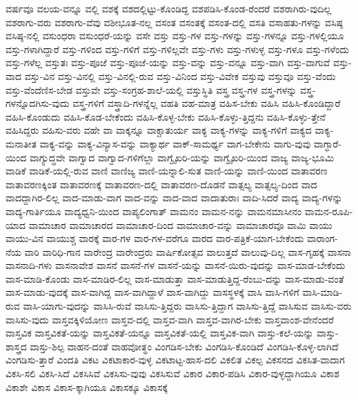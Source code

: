 {ವರ್ಷವೂ
ವಲಯ-ವನ್ನೂ
ವಲ್ಲಿ
ವಶಕ್ಕೆ
ವಶದಲ್ಲಿಟ್ಟು-ಕೊಂಡಿದ್ದ
ವಶಪಡಿಸಿ-ಕೊಂಡ-ರೆಂದರೆ
ವಶರಾಗಿರು-ವುದಿಲ್ಲ
ವಶರಾಗು-ವರು
ವಶರಾಗು-ವೆವು
ವಶೀಭೂತ-ನಲ್ಲ
ವಸಂತ
ವಸಂತಕ್ಕೆ
ವಸಂತ-ದಲ್ಲಿ
ವಸತಿ
ವಸಾಹತು-ಗಳನ್ನು
ವಸಿಷ್ಠ
ವಸಿಷ್ಠ-ನಲ್ಲಿ
ವಸುಂಧರಾ
ವಸುಂಧರೆ-ಯನ್ನು
ವಸೇ
ವಸ್ತು
ವಸ್ತು-ಗಳ
ವಸ್ತು-ಗಳನ್ನು
ವಸ್ತು-ಗಳನ್ನೂ
ವಸ್ತು-ಗಳಲ್ಲಿಯೂ
ವಸ್ತು-ಗಳಾಗಿದ್ದಾರೆ
ವಸ್ತು-ಗಳಿಂದ
ವಸ್ತು-ಗಳಿಗೆ
ವಸ್ತು-ಗಳಿಲ್ಲವೇ
ವಸ್ತು-ಗಳು
ವಸ್ತು-ಗಳುಳ್ಳ
ವಸ್ತು-ಗಳೂ
ವಸ್ತು-ಗಳೆಂದು
ವಸ್ತು-ಗಳೆಲ್ಲ
ವಸ್ತುತಃ
ವಸ್ತು-ಪೂಜೆ
ವಸ್ತು-ಪೂಜೆ-ಯನ್ನು
ವಸ್ತು-ವನ್ನು
ವಸ್ತು-ವನ್ನೂ
ವಸ್ತು-ವಾಗಿ
ವಸ್ತು-ವಾಗುವೆ
ವಸ್ತು-ವಾದ
ವಸ್ತು-ವಿನ
ವಸ್ತು-ವಿನಲ್ಲಿ
ವಸ್ತು-ವಿನಲ್ಲಿ-ರುವ
ವಸ್ತು-ವಿನಿಂದ
ವಸ್ತು-ವಿವೇಕ
ವಸ್ತುವು
ವಸ್ತುವೂ
ವಸ್ತು-ವೆಂದು
ವಸ್ತು-ವೆಂದೆಣಿಸ-ಬೇಡ
ವಸ್ತುವೇ
ವಸ್ತು-ಸಂಗ್ರಹ-ಶಾಲೆ-ಯಲ್ಲಿ
ವಸ್ತುಸ್ಥಿತಿ
ವಸ್ತ್ರ
ವಸ್ತ್ರ-ಗಳ
ವಸ್ತ್ರ-ಗಳನ್ನು
ವಸ್ತ್ರ-ಗಳನ್ನೊದಗಿಸು-ವುದು
ವಸ್ತ್ರ-ಗಳಿಗೆ
ವಸ್ತ್ರಾದಿ-ಗಳನ್ನೆಲ್ಲ
ವಹತಿ
ವಹ-ಮಾತ್ರ
ವಹಿಸ-ಬೇಕು
ವಹಿಸಿ
ವಹಿಸಿ-ಕೊಂಡಿದ್ದಾರೆ
ವಹಿಸಿ-ಕೊಂಡುದು
ವಹಿಸಿ-ಕೊಡ-ಬೇಕೆಂದು
ವಹಿಸಿ-ಕೊಳ್ಳ-ಬೇಕು
ವಹಿಸಿ-ಕೊಳ್ಳು-ತ್ತಿದ್ದನು
ವಹಿಸಿ-ಕೊಳ್ಳು-ತ್ತೇನೆ
ವಹಿಸಿದ್ದರು
ವಹಿಸು-ವರು
ವಹೇ
ವಾ
ವಾಕ್ಕನ್ನೂ
ವಾಕ್ಚಾತುರ್ಯ
ವಾಕ್ಯ
ವಾಕ್ಯ-ಗಳನ್ನು
ವಾಕ್ಯ-ಗಳಿಗೆ
ವಾಕ್ಯದ
ವಾಕ್ಯ-ಮನಾತೀತ
ವಾಕ್ಯ-ವನ್ನು
ವಾಕ್ಯ-ವಿನ್ಯಾಸ-ವನ್ನು
ವಾಕ್ಯಾರ್ಥ
ವಾಕ್-ಸಾಮರ್ಥ್ಯ
ವಾಗ-ಬೇಕೇನು
ವಾಗು-ವುವು
ವಾಗ್ಧಾರೆ-ಯಿಂದ
ವಾಗ್ಯುದ್ಧವೇ
ವಾಗ್ವಾದ
ವಾಗ್ವಾದ-ಗಳಿಗೆಲ್ಲಾ
ವಾಗ್ವೈಖರಿ-ಯನ್ನು
ವಾಗ್ವೈಖರಿ-ಯಿಂದ
ವಾಜ್ಯ
ವಾಜ್ಯ-ಭೂಮಿ
ವಾಡಿಕೆ
ವಾಡಿಕೆ-ಯಲ್ಲಿ-ರುವ
ವಾಣಿ
ವಾಣಿಜ್ಯ
ವಾಣಿ-ಯನ್ನಾಲಿ-ಸುತ
ವಾಣಿ-ಯನ್ನು
ವಾಣಿ-ಯಿಂದ
ವಾತಾವರಣ
ವಾತಾವರಣಕ್ಕಿಂತ
ವಾತಾವರಣಕ್ಕೆ
ವಾತಾವರಣ-ದಲ್ಲಿ
ವಾತಾವರಣ-ದೊಡನೆ
ವಾತ್ಸಲ್ಯ
ವಾತ್ಸಲ್ಯ-ದಿಂದ
ವಾದ
ವಾದದ್ದಾಗಿರ-ಲಿಲ್ಲ
ವಾದ-ಮಾಡು-ವಾಗ
ವಾದ-ವನ್ನು
ವಾದ-ವಾದ
ವಾದಾತುರಾಃ
ವಾದಿ-ಸಿದರೆ
ವಾದ್ಯ
ವಾದ್ಯ-ಗಳನ್ನು
ವಾದ್ಯ-ಗಾರ್ತಿಯೂ
ವಾದ್ಯಧ್ವನಿ-ಯಿಂದ
ವಾಪ್ಯಲಿಂಗಾತ್
ವಾಮನಂ
ವಾಮನ-ನನ್ನು
ವಾಮನಮಾಸೀನಂ
ವಾಮನ-ರೂಪಿ-ಯಾದ
ವಾಮಾಚಾರ
ವಾಮಾಚಾರದ
ವಾಮಾಚಾರ-ದಿಂದ
ವಾಮಾಚಾರ-ವನ್ನು
ವಾಮಾಚಾರವೂ
ವಾಮಿ
ವಾಯು
ವಾಯು-ವಿನ
ವಾಯುಶ್ಚ
ವಾರಕ್ಕೆ
ವಾರ-ಗಳ
ವಾರ-ಗಳ-ವರೆಗೂ
ವಾರದ
ವಾರ-ಪತ್ರಿಕೆ-ಯಾಗ-ಬೇಕೆಂದು
ವಾರಾಂಗ-ನೆಯ
ವಾರಿ
ವಾರಿಧಿ-ಗಾನ
ವಾರೇಂದ್ರ
ವಾರೇಂದ್ರರು
ವಾರ್ಷಿಕೋತ್ಸವ
ವಾಲುತ್ತದೆ
ವಾಲುವು-ದಿಲ್ಲ
ವಾಸ-ಗೃಹಕ್ಕೆ
ವಾಸನಾ
ವಾಸನಾದಿ-ಗಳು
ವಾಸನಾವೇಶ
ವಾಸನೆ
ವಾಸನೆ-ಗಳ
ವಾಸನೆ-ಯನ್ನು
ವಾಸನೆ-ಯಿರು-ವುದನ್ನು
ವಾಸ-ಮಾಡ-ಬೇಕೆಂದು
ವಾಸ-ಮಾಡಿ-ಕೊಂಡು
ವಾಸ-ಮಾಡಿರ-ಲಿಲ್ಲ
ವಾಸ-ಮಾಡುತ್ತಾ
ವಾಸ-ಮಾಡುತ್ತಿದ್ದ-ರೆಂಬು-ದನ್ನು
ವಾಸ-ಮಾಡು-ವಂತೆ
ವಾಸ-ಮಾಡು-ವುದಕ್ಕೆ
ವಾಸ-ವಾಗಿದ್ದ
ವಾಸ-ವಾಗಿದ್ದಾಳೆ
ವಾಸ-ವಾಗಿದ್ದು
ವಾಸಸ್ಥಳಕ್ಕೆ
ವಾಸಿ
ವಾಸಿ-ಗಳಿಗೆ
ವಾಸಿ-ಮಾಡಿ-ರುವ
ವಾಸಿ-ಯಾಗು-ವುದನ್ನು
ವಾಸಿಸಿ-ರುವೆ
ವಾಸಿಸು-ತ್ತಿದ್ದರು
ವಾಸಿಸು-ತ್ತಿದ್ದಾಗ
ವಾಸಿಸು-ತ್ತಿದ್ದೆ
ವಾಸಿಸುವ
ವಾಸಿಸು-ವರು
ವಾಸಿಸು-ವುದು
ವಾಸ್ತವಕ್ಕಿಳಿಯೋಣ
ವಾಸ್ತವ-ದಲ್ಲಿ
ವಾಸ್ತವ-ವಾಗಿ
ವಾಸ್ತವ-ವಾಗಿರ-ಬೇಕು
ವಾಸ್ತವಾಂಶ-ವೇನೆಂದರೆ
ವಾಸ್ತವಿಕ
ವಾಸ್ತವಿಕತೆ-ಯನ್ನು
ವಾಸ್ತವಿಕತೆ-ಯನ್ನೂ
ವಾಸ್ತವಿಕತೆ-ಯಲ್ಲಿ
ವಾಸ್ತವಿಕ-ವಾಗಿ
ವಾಸ್ತು-ಕಲೆ-ಯನ್ನು
ವಾಸ್ತು-ಶಾಸ್ತ್ರದ
ವಾಸ್ತು-ಶಿಲ್ಪ
ವಾಹನ-ದಂತೆ
ವಾಹವೋತ್ಥಂ
ವಿಂಗಡಿಸ-ಬೇಕು
ವಿಂಗಡಿಸಿ-ಕೊಂಡಿದೆ
ವಿಂಗಡಿಸಿ-ಕೊಳ್ಳ-ಲಾಗಿದೆ
ವಿಂಗಡಿಸು-ತ್ತಾರೆ
ವಿಂದತಿ
ವಿಕಟ
ವಿಕಟಾಕಾರ-ವುಳ್ಳ
ವಿಕಟಾಟ್ಟ-ಹಾಸ-ದಲಿ
ವಿಕಲಿತ
ವಿಕಲ್ಪ
ವಿಕಸನದ
ವಿಕಸಿತ-ವಾದಾಗ
ವಿಕಸಿ-ಸಲಿ
ವಿಕಸಿ-ಸಿದೆ
ವಿಕಸಿಸಿವೆ
ವಿಕಸಿಸು-ವುವು
ವಿಕಸಿಸುವೆ
ವಿಕಾರ
ವಿಕಾರ-ಪಡಿಸಿ
ವಿಕಾರ-ವುಳ್ಳದ್ದಾಗಿಯೂ
ವಿಕಾಶ
ವಿಕಾಶೇ
ವಿಕಾಸ
ವಿಕಾಸ-ಕ್ಕಾಗಿಯೂ
ವಿಕಾಸಕ್ಕೂ
ವಿಕಾಸಕ್ಕೆ
}
